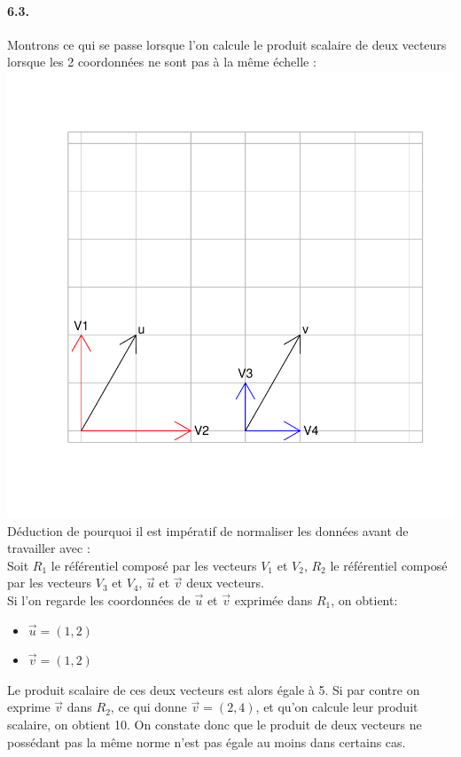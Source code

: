 \documentclass{article}
\begin{document}
\paragraph{6.3.}Montrons ce qui se passe lorsque l'on calcule le produit
 scalaire de deux vecteurs lorsque les 2 coordonnées ne sont pas à la 
 même échelle :
\includegraphics{rapport-graphic}
\newline
Déduction de pourquoi il est impératif de normaliser les données avant 
de travailler avec :\\
Soit $R_{1}$ le référentiel composé par les vecteurs $V_{1}$ et $V_{2}$,
 $R_{2}$ le référentiel composé par les vecteurs $V_{3}$ et $V_{4}$, 
 $\vec{u}$ et $\vec{v}$ deux vecteurs. \\
Si l'on regarde les coordonnées de $\vec{u}$ et $\vec{v}$ exprimée dans 
$R_{1}$, on obtient:
\begin{itemize}
	\item{$\vec{u}=(1,2)$}
	\item{$\vec{v}=(1,2)$}
\end{itemize}
Le produit scalaire de ces deux vecteurs est alors égale à 5.
Si par contre on exprime $\vec{v}$ dans $R_{2}$, ce qui donne $\vec{v}=(2,4)$, et qu'on calcule leur produit scalaire, on obtient 10.
On constate donc que le produit de deux vecteurs ne possédant pas la même norme n'est pas égale au moins dans certains cas.
\end{document}

